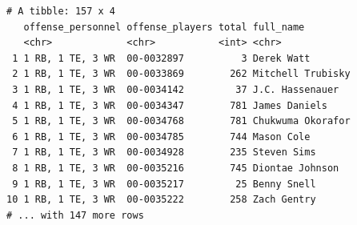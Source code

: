 \documentclass[
  letterpaper,
]{krantz}
\begin{document}
\begin{verbatim}
# A tibble: 157 x 4
   offense_personnel offense_players total full_name        
   <chr>             <chr>           <int> <chr>            
 1 1 RB, 1 TE, 3 WR  00-0032897          3 Derek Watt       
 2 1 RB, 1 TE, 3 WR  00-0033869        262 Mitchell Trubisky
 3 1 RB, 1 TE, 3 WR  00-0034142         37 J.C. Hassenauer  
 4 1 RB, 1 TE, 3 WR  00-0034347        781 James Daniels    
 5 1 RB, 1 TE, 3 WR  00-0034768        781 Chukwuma Okorafor
 6 1 RB, 1 TE, 3 WR  00-0034785        744 Mason Cole       
 7 1 RB, 1 TE, 3 WR  00-0034928        235 Steven Sims      
 8 1 RB, 1 TE, 3 WR  00-0035216        745 Diontae Johnson  
 9 1 RB, 1 TE, 3 WR  00-0035217         25 Benny Snell      
10 1 RB, 1 TE, 3 WR  00-0035222        258 Zach Gentry      
# ... with 147 more rows
\end{verbatim}
\end{document}
